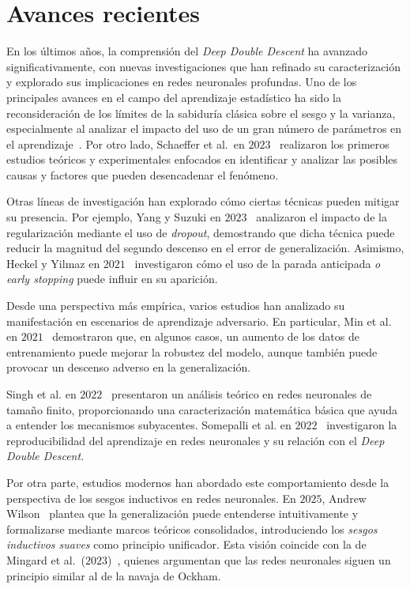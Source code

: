 \section{Avances recientes}\label{}

En los últimos años, la comprensión del \textit{Deep Double Descent} ha avanzado significativamente, con nuevas investigaciones que han refinado su caracterización y explorado sus implicaciones en redes neuronales profundas. Uno de los principales avances en el campo del aprendizaje estadístico ha sido la reconsideración de los límites de la sabiduría clásica sobre el sesgo y la varianza, especialmente al analizar el impacto del uso de un gran número de parámetros en el aprendizaje~\cite{Zhang2021,Curth2023}. Por otro lado, Schaeffer et al.\ en $2023$~\cite{Schaeffer2023} realizaron los primeros estudios teóricos y experimentales enfocados en identificar y analizar las posibles causas y factores que pueden desencadenar el fenómeno.

Otras líneas de investigación han explorado cómo ciertas técnicas pueden mitigar su presencia. Por ejemplo, Yang y Suzuki en $2023$~\cite{Yang2024} analizaron el impacto de la regularización mediante el uso de \textit{dropout}, demostrando que dicha técnica puede reducir la magnitud del segundo descenso en el error de generalización. Asimismo, Heckel y Yilmaz en $2021$~\cite{Heckel2020} investigaron cómo el uso de la parada anticipada \emph{o early stopping} puede influir en su aparición.

Desde una perspectiva más empírica, varios estudios han analizado su manifestación en escenarios de aprendizaje adversario. En particular, Min et al. en $2021$~\cite{Ming2020} demostraron que, en algunos casos, un aumento de los datos de entrenamiento puede mejorar la robustez del modelo, aunque también puede provocar un descenso adverso en la generalización.

Singh et al. en $2022$~\cite{Singh2022} presentaron un análisis teórico en redes neuronales de tamaño finito, proporcionando una caracterización matemática básica que ayuda a entender los mecanismos subyacentes. Somepalli et al. en $2022$~\cite{Somepalli2022} investigaron la reproducibilidad del aprendizaje en redes neuronales y su relación con el \textit{Deep Double Descent}.

Por otra parte, estudios modernos han abordado este comportamiento desde la perspectiva de los sesgos inductivos en redes neuronales. En $2025$, Andrew Wilson~\cite{Wilson2025} plantea que la generalización puede entenderse intuitivamente y formalizarse mediante marcos teóricos consolidados, introduciendo los \textit{sesgos inductivos suaves} como principio unificador. Esta visión coincide con la de Mingard et al.\ ($2023$)~\cite{Mingard2023}, quienes argumentan que las redes neuronales siguen un principio similar al de la navaja de Ockham.

